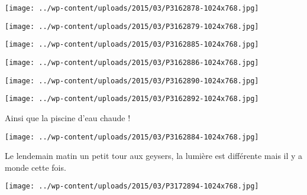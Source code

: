  

\begin{center} \texttt{[image: ../wp-content/uploads/2015/03/P3162878-1024x768.jpg]} \end{center}



 

\begin{center} \texttt{[image: ../wp-content/uploads/2015/03/P3162879-1024x768.jpg]} \end{center}



 

\begin{center} \texttt{[image: ../wp-content/uploads/2015/03/P3162885-1024x768.jpg]} \end{center}



 

\begin{center} \texttt{[image: ../wp-content/uploads/2015/03/P3162886-1024x768.jpg]} \end{center}



 

\begin{center} \texttt{[image: ../wp-content/uploads/2015/03/P3162890-1024x768.jpg]} \end{center}



 

\begin{center} \texttt{[image: ../wp-content/uploads/2015/03/P3162892-1024x768.jpg]} \end{center}

 

 Ainsi que la piscine d'eau chaude ! 

 

\begin{center} \texttt{[image: ../wp-content/uploads/2015/03/P3162884-1024x768.jpg]} \end{center}

 

 Le lendemain matin un petit tour aux geysers, la lumière est différente mais il y a monde cette fois. 

 

\begin{center} \texttt{[image: ../wp-content/uploads/2015/03/P3172894-1024x768.jpg]} \end{center}



